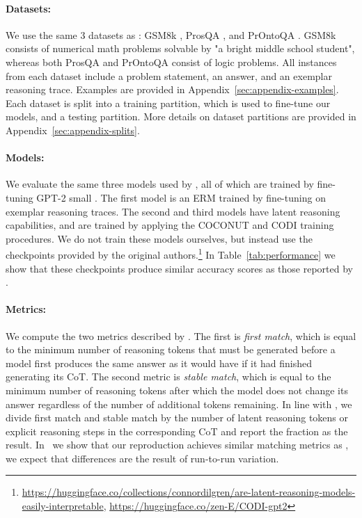 \documentclass[11pt]{article}
\begin{document}
\paragraph{Datasets:} We use the same 3 datasets as \citet{dilgren2026latent}: GSM8k \cite{cobbe2021training}, ProsQA \cite{hao2024training}, and PrOntoQA \cite{saparov2022language}. GSM8k consists of numerical math problems solvable by "a bright middle school student", whereas both ProsQA and PrOntoQA consist of logic problems. All instances from each dataset include a problem statement, an answer, and an exemplar reasoning trace. Examples are provided in Appendix~\ref{sec:appendix-examples}. Each dataset is split into a training partition, which is used to fine-tune our models, and a testing partition. More details on dataset partitions are provided in Appendix~\ref{sec:appendix-splits}.

\paragraph{Models:} We evaluate the same three models used by \citet{dilgren2026latent}, all of which are trained by fine-tuning GPT-2 small \cite{radford2019language}. The first model is an ERM trained by fine-tuning on exemplar reasoning traces. The second and third models have latent reasoning capabilities, and are trained by applying the COCONUT \citep{hao2024training} and CODI \citep{shen2025codi} training procedures. We do not train these models ourselves, but instead use the checkpoints provided by the original authors.\footnote{\hyperlink{https://huggingface.co/collections/connordilgren/are-latent-reasoning-models-easily-interpretable}{https://huggingface.co/collections/connordilgren/are-latent-reasoning-models-easily-interpretable}, \hyperlink{https://huggingface.co/zen-E/CODI-gpt2}{https://huggingface.co/zen-E/CODI-gpt2}} In Table~\ref{tab:performance} we show that these checkpoints produce similar accuracy scores as those reported by \citet{dilgren2026latent}.

\paragraph{Metrics:} We compute the two metrics described by \citet{dilgren2026latent}. The first is \emph{first match}, which is equal to the minimum number of reasoning tokens that must be generated before a model first produces the same answer as it would have if it had finished generating its CoT. The second metric is \emph{stable match}, which is equal to the minimum number of reasoning tokens after which the model does not change its answer regardless of the number of additional tokens remaining. In line with \citet{dilgren2026latent}, we divide first match and stable match by the number of latent reasoning tokens or explicit reasoning steps in the corresponding CoT and report the fraction as the result. In~ we show that our reproduction achieves similar matching metrics as \citet{dilgren2026latent}, we expect that differences are the result of run-to-run variation.
\end{document}
